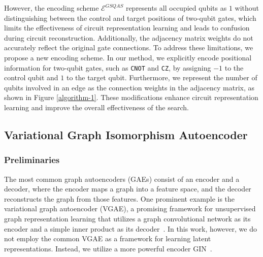 \documentclass{article} %
\begin{document}
However, the encoding scheme $\mathcal{E}^{GSQAS}$ represents all occupied qubits as $1$ without distinguishing between the control and target positions of two-qubit gates, which limits the effectiveness of circuit representation learning and leads to confusion during circuit reconstruction. Additionally, the adjacency matrix weights do not accurately reflect the original gate connections. To address these limitations, we propose a new encoding scheme. In our method, we explicitly encode positional information for two-qubit gates, such as \texttt{CNOT} and \texttt{CZ}, by assigning $-1$ to the control qubit and $1$ to the target qubit. Furthermore, we represent the number of qubits involved in an edge as the connection weights in the adjacency matrix, as shown in Figure \ref{algorithm-1}. These modifications enhance circuit representation learning and improve the overall effectiveness of the search.

\subsection{Variational Graph Isomorphism Autoencoder}
\subsubsection{Preliminaries}
The most common graph autoencoders (GAEs) consist of an encoder and a decoder, where the encoder maps a graph into a feature space, and the decoder reconstructs the graph from those features. One prominent example is the variational graph autoencoder (VGAE), a promising framework for unsupervised graph representation learning that utilizes a graph convolutional network as its encoder and a simple inner product as its decoder~\citep{kipf2016variational}. In this work, however, we do not employ the common VGAE as a framework for learning latent representations. Instead, we utilize a more powerful encoder GIN~\citep{xu2019powerful}.
\end{document}
